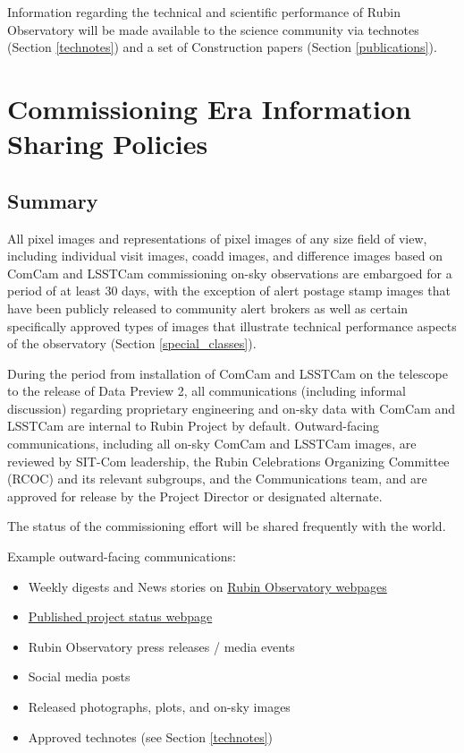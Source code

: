 \documentclass[SE,authoryear,toc]{lsstdoc}
\begin{document}
Information regarding the technical and scientific performance of Rubin Observatory will be made available to the science community via technotes (Section \ref{technotes}) and a set of Construction papers (Section \ref{publications}).

\section{Commissioning Era Information Sharing Policies}
\label{policy}

\subsection{Summary}

All pixel images and representations of pixel images of any size field of view, including individual visit images, coadd images, and difference images based on ComCam and LSSTCam commissioning on-sky observations are embargoed for a period of at least 30 days, with the exception of alert postage stamp images that have been publicly released to community alert brokers as well as certain specifically approved types of images that illustrate technical performance aspects of the observatory (Section \ref{special_classes}).

During the period from installation of ComCam and LSSTCam on the telescope to the release of Data Preview 2, all communications (including informal discussion) regarding proprietary engineering and on-sky data with ComCam and LSSTCam are internal to Rubin Project by default.
Outward-facing communications, including all on-sky ComCam and LSSTCam images, are reviewed by SIT-Com leadership, the Rubin Celebrations Organizing Committee (RCOC) and its relevant subgroups, and the Communications team, and are approved for release by the Project Director or designated alternate.

The status of the commissioning effort will be shared frequently with the world.

Example outward-facing communications:

\begin{itemize}

  \item Weekly digests and News stories on \href{https://rubinobservatory.org/}{Rubin Observatory webpages}

  \item \href{https://www.lsst.org/about/project-status}{Published project status webpage}

  \item Rubin Observatory press releases / media events

  \item Social media posts

  \item Released photographs, plots, and on-sky images

  \item Approved technotes (see Section \ref{technotes})

\end{itemize}
\end{document}
